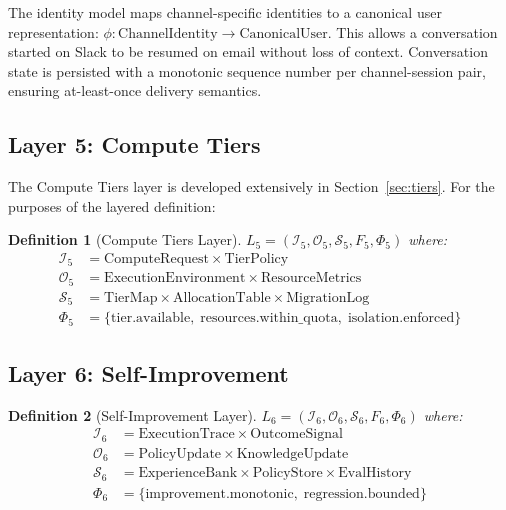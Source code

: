 \documentclass[11pt]{article}
\newtheorem{definition}{Definition}
\begin{document}
The identity model maps channel-specific identities to a canonical user
representation: $\phi : \text{ChannelIdentity} \to \text{CanonicalUser}$.
This allows a conversation started on Slack to be resumed on email without
loss of context. Conversation state is persisted with a monotonic sequence
number per channel-session pair, ensuring at-least-once delivery semantics.

\subsection{Layer 5: Compute Tiers}

The Compute Tiers layer is developed extensively in Section~\ref{sec:tiers}.
For the purposes of the layered definition:

\begin{definition}[Compute Tiers Layer]
    $L_5 = \left(\mathcal{I}_5, \mathcal{O}_5, \mathcal{S}_5, F_5, \Phi_5\right)$ where:
    \begin{align*}
        \mathcal{I}_5 &= \text{ComputeRequest} \times \text{TierPolicy} \\
        \mathcal{O}_5 &= \text{ExecutionEnvironment} \times \text{ResourceMetrics} \\
        \mathcal{S}_5 &= \text{TierMap} \times \text{AllocationTable} \times
                         \text{MigrationLog} \\
        \Phi_5 &= \{\text{tier.available},\; \text{resources.within\_quota},\;
                    \text{isolation.enforced}\}
    \end{align*}
\end{definition}

\subsection{Layer 6: Self-Improvement}

\begin{definition}[Self-Improvement Layer]
    $L_6 = \left(\mathcal{I}_6, \mathcal{O}_6, \mathcal{S}_6, F_6, \Phi_6\right)$ where:
    \begin{align*}
        \mathcal{I}_6 &= \text{ExecutionTrace} \times \text{OutcomeSignal} \\
        \mathcal{O}_6 &= \text{PolicyUpdate} \times \text{KnowledgeUpdate} \\
        \mathcal{S}_6 &= \text{ExperienceBank} \times \text{PolicyStore} \times
                         \text{EvalHistory} \\
        \Phi_6 &= \{\text{improvement.monotonic},\;
                    \text{regression.bounded}\}
    \end{align*}
\end{definition}
\end{document}
